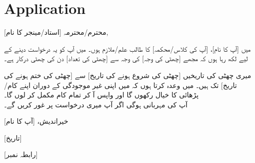 \documentclass[12pt]{article}
\begin{document}
{ \tableofcontents}



\begin{otherlanguage}{english}
\begin{flushleft}

\end{flushleft}
\end{otherlanguage}

\vspace{0.5in}


\section{
Application
}

محترم/محترمہ [استاد/مینجر کا نام],

\vspace{1cm}
\hspace{4cm}
میں [آپ کا نام]، [آپ کی کلاس/محکمہ] کا طالب علم/ملازم ہوں۔ میں آپ کو یہ درخواست دینے کے لیے لکھ رہا ہوں کہ مجھے [چھٹی کی وجہ] کی وجہ سے [چھٹی کی تعداد] دن کی چھٹی درکار ہے۔

\vspace{0.5cm}
میری چھٹی کی تاریخیں [چھٹی کی شروع ہونے کی تاریخ] سے [چھٹی کی ختم ہونے کی تاریخ] تک ہیں۔ میں وعدہ کرتا ہوں کہ میں اپنی غیر موجودگی کے دوران اپنے کام/پڑھائی کا خیال رکھوں گا اور واپس آ کر تمام کام مکمل کر لوں گا۔
\\
آپ کی مہربانی ہوگی اگر آپ میری درخواست پر غور کریں گے۔

\vspace{0.5cm}

\vspace{1cm}
\hfill
خیراندیش، [آپ کا نام]

\hfill
[تاریخ]

\hfill
[رابطہ نمبر]
\end{document}
